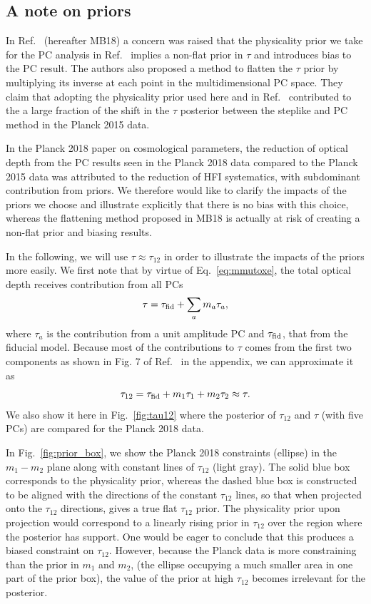 \documentclass[prd,twocolumn,amsmath,amssymb,floatfix,superscriptaddress,nofootinbib]{revtex4-1}
\newcommand{\beq}{\begin{equation}}
\newcommand{\eeq}{\end{equation}}
\begin{document}
\subsection{A note on priors}

In Ref.~\cite{Millea:2018bko} (hereafter MB18)  a concern was raised that the physicality prior we take for the PC analysis in Ref.~\cite{Heinrich:2016ojb} implies a non-flat prior in $\tau$ and introduces bias to the PC result. The authors also proposed a method to flatten the $\tau$ prior by multiplying its inverse at each point in the multidimensional PC space. They claim that adopting the physicality prior used here and in Ref.~\cite{Heinrich:2016ojb} contributed to the a large fraction of the shift in the $\tau$ posterior between the steplike and PC method in the Planck 2015 data. 

In the Planck 2018 paper on cosmological parameters, the reduction of optical depth from the PC results seen in the Planck 2018 data compared to the Planck 2015 data was attributed to the reduction of HFI systematics, with subdominant contribution from priors. We therefore would like to clarify the impacts of the priors we choose and illustrate explicitly that there is no bias with this choice, whereas the flattening method proposed in MB18 is actually at risk of creating a non-flat prior and biasing results.

In the following, we will use $\tau \approx \tau_{12}$ in order to illustrate the impacts of the priors more easily. We first note that by virtue of Eq.~\ref{eq:mmutoxe}, the total optical depth receives contribution from all PCs
\beq
\tau = \tau_{\rm fid} + \sum_a m_a \tau_a,
\eeq
where $\tau_a$ is the contribution from a unit amplitude PC and $\tau_{\rm fid}$, that from the fiducial model. Because most of the contributions to $\tau$ comes from the first two components as shown in Fig. 7 of Ref.~\cite{Heinrich:2018btc} in the appendix, we can approximate it as
\beq
\tau_{12} = \tau_{\rm fid} + m_1 \tau_1 + m_2 \tau_2 \approx \tau.
\eeq
We also show it here in Fig.~\ref{fig:tau12} where the posterior of $\tau_{12}$ and $\tau$ (with five PCs) are compared for the Planck 2018 data.

In Fig.~\ref{fig:prior_box}, we show the Planck 2018 constraints (ellipse) in the $m_1-m_2$ plane along with constant lines of $\tau_{12}$ (light gray). The solid blue box corresponds to the physicality prior, whereas the dashed blue box is constructed to be aligned with the directions of the constant $\tau_{12}$ lines, so that when projected onto the $\tau_{12}$ directions, gives a true flat $\tau_{12}$ prior. The physicality prior upon projection would correspond to a linearly rising prior in $\tau_{12}$ over the region where the posterior has support. One would be eager to conclude that this produces a biased constraint on $\tau_{12}$. However, because the Planck data is more constraining than the prior in $m_1$ and $m_2$, (the ellipse occupying a much smaller area in one part of the prior box), the value of the prior at high $\tau_{12}$ becomes irrelevant for the posterior.
\end{document}
